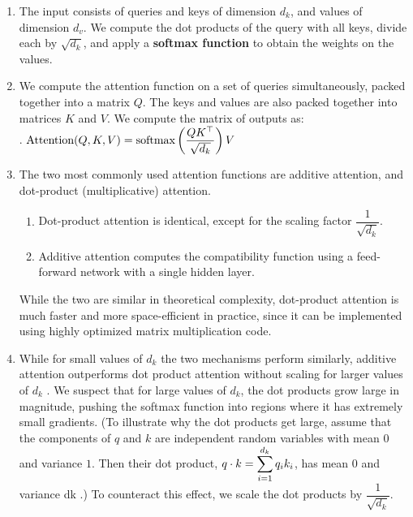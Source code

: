 \begin{enumerate}
    \item The input consists of queries and keys of dimension $d_k$, and values of dimension $d_v$. 
    We compute the dot products of the query with all keys, divide each by $\sqrt{d_k}$, and apply a \textbf{softmax function} to obtain the weights on the values.
    \hfill \cite{arxiv/1706.03762/Attention-Is-All-You-Need}

    \item We compute the attention function on a set of queries simultaneously, packed together into a matrix $Q$. 
    The keys and values are also packed together into matrices $K$ and $V $. 
    We compute the matrix of outputs as:
    \hfill \cite{arxiv/1706.03762/Attention-Is-All-You-Need}
    \\[0.2cm]
    .\hfill
    $
        \text{Attention}(Q, K, V ) 
        = \text{softmax}\left(\dfrac{QK^\top}{\sqrt{d_k}}\right)V
    $
    \hfill \cite{arxiv/1706.03762/Attention-Is-All-You-Need}

    \item The two most commonly used attention functions are additive attention, and dot-product (multiplicative) attention.
    \hfill \cite{arxiv/1706.03762/Attention-Is-All-You-Need}
    \begin{enumerate}
        \item Dot-product attention is identical, except for the scaling factor $\dfrac{1}{\sqrt{d_k}}$.
        \hfill \cite{arxiv/1706.03762/Attention-Is-All-You-Need}

        \item Additive attention computes the compatibility function using a feed-forward network with a single hidden layer.
        \hfill \cite{arxiv/1706.03762/Attention-Is-All-You-Need}
    \end{enumerate}
    While the two are similar in theoretical complexity, dot-product attention is much faster and more space-efficient in practice, since it can be implemented using highly optimized matrix multiplication code.
    \hfill \cite{arxiv/1706.03762/Attention-Is-All-You-Need}

    \item While for small values of $d_k$ the two mechanisms perform similarly, additive attention outperforms dot product attention without scaling for larger values of $d_k$ .
    We suspect that for large values of $d_k$, the dot products grow large in magnitude, pushing the softmax function into regions where it has extremely small gradients. 
    (To illustrate why the dot products get large, assume that the components of $q$ and $k$ are independent random variables with mean $0$ and variance $1$. 
    Then their dot product, $q \cdot k = \displaystyle\sum^{d_k} _{i=1} q_ik_i$, has mean 0 and variance dk .)
    To counteract this effect, we scale the dot products by $\dfrac{1}{\sqrt{d_k}}$.
    \hfill \cite{arxiv/1706.03762/Attention-Is-All-You-Need}
\end{enumerate}









